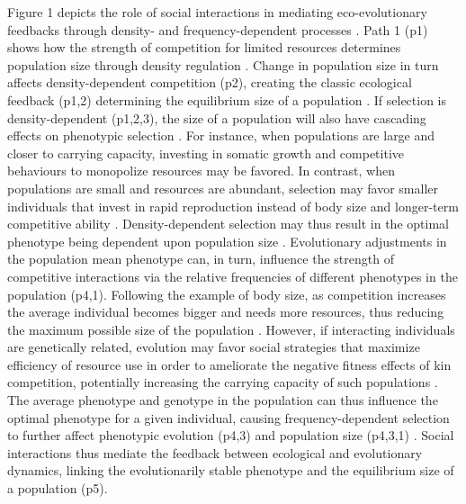 \documentclass{article}
\begin{document}
 Figure 1 depicts the role of social interactions in mediating eco-evolutionary feedbacks through density- and frequency-dependent processes \citep{Engen2020}. Path 1 (p1) shows how the strength of competition for limited resources determines population size through density regulation \citep{Gilpin1973a}. Change in population size in turn affects density-dependent competition (p2), creating the classic ecological feedback (p1,2) determining the equilibrium size of a population \citep{Travis2013}. If selection is density-dependent (p1,2,3), the size of a population will also have cascading effects on phenotypic selection  \citep{Mueller1997, Boyce1984}. For instance, when populations are large and closer to carrying capacity, investing in somatic growth and competitive behaviours to monopolize resources may be favored. In contrast, when populations are small and resources are abundant, selection may favor smaller individuals that invest in rapid reproduction instead of body size and longer-term competitive ability \citep{Joshi2001, Wright2018, Engen2017}. Density-dependent selection may thus result in the optimal phenotype being dependent upon population size \citep{Anderson1971, Charlesworth1971}. Evolutionary adjustments in the population mean phenotype can, in turn, influence the strength of competitive interactions via the relative frequencies of different phenotypes in the population \citep{Wright1969} (p4,1). Following the example of body size, as competition increases the average individual becomes bigger and needs more resources, thus reducing the maximum possible size of the population \citep{Engen2020}. However, if interacting individuals are genetically related, evolution may favor social strategies that maximize efficiency of resource use in order to ameliorate the negative fitness effects of kin competition, potentially increasing the carrying capacity of such populations \citep{Boyce1984, macarthur1967theory}. The average phenotype and genotype in the population can thus influence the optimal phenotype for a given individual, causing frequency-dependent selection to further affect phenotypic evolution (p4,3) \citep{Heino1998} and population size (p4,3,1) \citep{Svensson2018}. Social interactions thus mediate the feedback between ecological and evolutionary dynamics, linking the evolutionarily stable phenotype and the equilibrium size of a population (p5).
\end{document}
